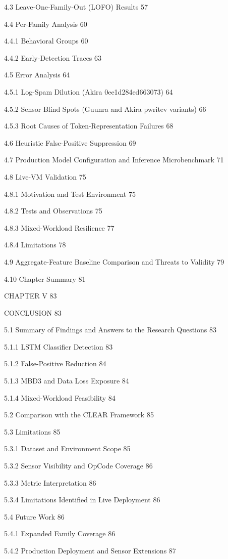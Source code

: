 4.3  Leave-One-Family-Out (LOFO) Results	57

4.4  Per-Family Analysis	60

4.4.1  Behavioral Groups	60

4.4.2  Early-Detection Traces	63

4.5  Error Analysis	64

4.5.1  Log-Spam Dilution (Akira 0ee1d284ed663073)	64

4.5.2  Sensor Blind Spots (Guunra and Akira pwritev variants)	66

4.5.3  Root Causes of Token-Representation Failures	68

4.6 Heuristic False-Positive Suppression	69

4.7  Production Model Configuration and Inference Microbenchmark	71

4.8  Live-VM Validation	75

4.8.1  Motivation and Test Environment	75

4.8.2  Tests and Observations	75

4.8.3  Mixed-Workload Resilience	77

4.8.4  Limitations	78

4.9  Aggregate-Feature Baseline Comparison and Threats to Validity	79

4.10  Chapter Summary	81

CHAPTER V	83

CONCLUSION	83

5.1  Summary of Findings and Answers to the Research Questions	83

5.1.1  \textmu{}LSTM Classifier Detection	83

5.1.2  False-Positive Reduction	84

5.1.3  MBD3 and Data Loss Exposure	84

5.1.4  Mixed-Workload Feasibility	84

5.2  Comparison with the CLEAR Framework	85

5.3  Limitations	85

5.3.1  Dataset and Environment Scope	85

5.3.2  Sensor Visibility and OpCode Coverage	86

5.3.3  Metric Interpretation	86

5.3.4  Limitations Identified in Live Deployment	86

5.4  Future Work	86

5.4.1  Expanded Family Coverage	86

5.4.2  Production Deployment and Sensor Extensions	87

